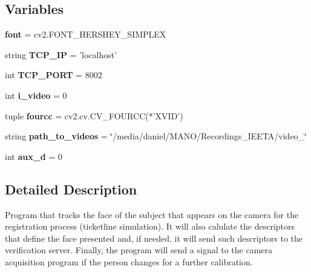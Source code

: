 \subsection*{Variables}
\begin{DoxyCompactItemize}
\item 
\hypertarget{namespaceregister__facetracker_a40fd762d6e26811e038be5b5eabb4aef}{{\bfseries font} = cv2.\-F\-O\-N\-T\-\_\-\-H\-E\-R\-S\-H\-E\-Y\-\_\-\-S\-I\-M\-P\-L\-E\-X}\label{namespaceregister__facetracker_a40fd762d6e26811e038be5b5eabb4aef}

\item 
\hypertarget{namespaceregister__facetracker_a8d029fb157738c48373876bb27ac948a}{string {\bfseries T\-C\-P\-\_\-\-I\-P} = 'localhost'}\label{namespaceregister__facetracker_a8d029fb157738c48373876bb27ac948a}

\item 
\hypertarget{namespaceregister__facetracker_aff2158cc5bc813254a9b6253552907f7}{int {\bfseries T\-C\-P\-\_\-\-P\-O\-R\-T} = 8002}\label{namespaceregister__facetracker_aff2158cc5bc813254a9b6253552907f7}

\item 
\hypertarget{namespaceregister__facetracker_ab04f6bd148a58de39688450276a2e334}{int {\bfseries i\-\_\-video} = 0}\label{namespaceregister__facetracker_ab04f6bd148a58de39688450276a2e334}

\item 
\hypertarget{namespaceregister__facetracker_a5d61b07c4d383a35444bd4fc8635fc8d}{tuple {\bfseries fourcc} = cv2.\-cv.\-C\-V\-\_\-\-F\-O\-U\-R\-C\-C($\ast$'X\-V\-I\-D')}\label{namespaceregister__facetracker_a5d61b07c4d383a35444bd4fc8635fc8d}

\item 
\hypertarget{namespaceregister__facetracker_abf9439e7a4b842139f8f2cce75df06dd}{string {\bfseries path\-\_\-to\-\_\-videos} = \char`\"{}/media/daniel/M\-A\-N\-O/Recordings\-\_\-\-I\-E\-E\-T\-A/video\-\_\-\char`\"{}}\label{namespaceregister__facetracker_abf9439e7a4b842139f8f2cce75df06dd}

\item 
\hypertarget{namespaceregister__facetracker_a966af50e6de058a6f5ce01585758a4dd}{int {\bfseries aux\-\_\-d} = 0}\label{namespaceregister__facetracker_a966af50e6de058a6f5ce01585758a4dd}

\end{DoxyCompactItemize}


\subsection{Detailed Description}
\begin{DoxyVerb}Program that tracks the face of the subject that appears on the camera for the registration process (ticketline simulation). 
It will also calulate the descriptors that define the face presented and, if needed, it will send such descriptors to the verification server.
Finally, the program will send a signal to the camera acquisition program if the person changes for a further calibration. 
\end{DoxyVerb}
 


